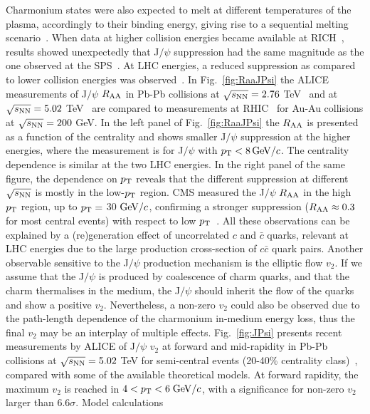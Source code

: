 Charmonium states were also expected to melt at different temperatures of 
the plasma, accordingly to their binding energy, giving rise to a sequential melting 
scenario~\cite{Du:2015wha,Digal:2001ue}. When
data at higher collision energies became available 
at RICH~\cite{Adare:2011yf,Adare:2006ns}, results showed unexpectedly that J$/\psi$ suppression 
had the same magnitude as the one observed at the SPS~\cite{Scomparin:2007rt}.
At LHC energies, a reduced suppression as compared to lower
collision energies was observed~\cite{Abelev:2013ila}.
In Fig.~\ref{fig:RaaJPsi} the ALICE measurements 
of J$/\psi$ $R_{\rm AA}$ in Pb-Pb collisions at $\sqrt{s_{\rm NN}} = 2.76$ TeV~\cite{Abelev:2013ila} 
and at $\sqrt{s_{\rm NN}} = 5.02$ TeV~\cite{Adam:2016rdg} are compared to measurements at 
RHIC~\cite{Adare:2011yf} for Au-Au collisions at $\sqrt{s_{\rm NN}} = 200$ GeV. In the left panel of Fig.~\ref{fig:RaaJPsi} 
the $R_{\rm AA}$ is presented as a function of the centrality and shows smaller J$/\psi$ suppression 
at the higher energies, where the measurement is for J$/\psi$ with $p_{\rm T} < 8\, \mathrm{GeV}/c$. 
The centrality dependence is similar at the two LHC energies. 
In the right panel of the same figure, the 
dependence on $p_{\rm T}$ reveals that the different suppression at different $\sqrt{s_{\rm NN}}$ is mostly
in the low-$p_{\rm T}$ region.
CMS measured the J$/\psi$ $R_{\rm AA}$ 
in the high $p_{\rm T}$ region, up to $p_{\rm T} = $ 30 $\mathrm{GeV}/c$, confirming a stronger suppression
($R_{\rm AA} \approx 0.3$ for most central events) with respect to 
low $p_{\rm T}$~\cite{Khachatryan:2016ypw}. All these observations can be 
explained by a (re)generation effect of uncorrelated $c$ and $\bar{c}$ quarks, relevant at LHC energies due to the 
large production cross-section of $c\bar{c}$ quark pairs. 
Another observable sensitive to the J$/\psi$ production 
mechanism is the elliptic flow $v_2$. If we assume that the J$/\psi$ is produced by coalescence 
of charm quarks, and that the charm thermalises in the medium, the J$/\psi$ 
should inherit the flow of the quarks and show a positive $v_2$. 
Nevertheless, a non-zero $v_2$ could also be observed due to the path-length dependence of the charmonium
in-medium energy loss, thus the final $v_2$ may be an 
interplay of multiple effects. Fig.~\ref{fig:JPsi} presents recent measurements 
by ALICE of J$/\psi$ $v_2$ at forward and mid-rapidity in Pb-Pb collisions at 
$\sqrt{s_{\rm NN}} = 5.02$ TeV for semi-central events (20-40\% centrality class)~\cite{Acharya:2017tgv}, 
compared with some of the available theoretical models. At forward rapidity, 
the maximum $v_2$ is reached in $4 < p_{\rm T} < 6\; \mathrm{GeV}/c$, with a 
significance for non-zero $v_2$ larger than $6.6\sigma$. Model calculations 
